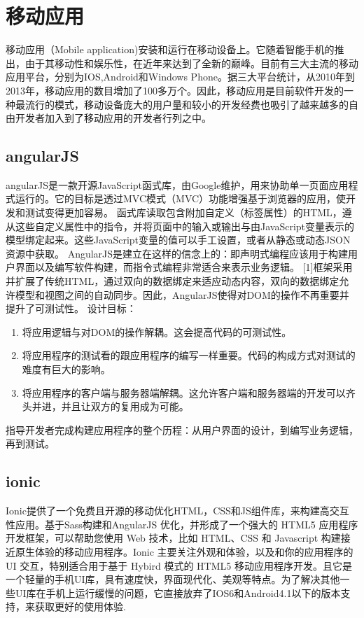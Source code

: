 \section{移动应用}
移动应用（Mobile application)安装和运行在移动设备上。它随着智能手机的推出，由于其移动性和娱乐性，在近年来达到了全新的巅峰。目前有三大主流的移动应用平台，分别为IOS,Android和Windows Phone。据三大平台统计，从2010年到2013年，移动应用的数目增加了100多万个。因此，移动应用是目前软件开发的一种最流行的模式，移动设备庞大的用户量和较小的开发经费也吸引了越来越多的自由开发者加入到了移动应用的开发者行列之中。
\subsection{angularJS}
angularJS是一款开源JavaScript函式库，由Google维护，用来协助单一页面应用程式运行的。它的目标是透过MVC模式（MVC）功能增强基于浏览器的应用，使开发和测试变得更加容易。
函式库读取包含附加自定义（标签属性）的HTML，遵从这些自定义属性中的指令，并将页面中的输入或输出与由JavaScript变量表示的模型绑定起来。这些JavaScript变量的值可以手工设置，或者从静态或动态JSON资源中获取。
AngularJS是建立在这样的信念上的：即声明式编程应该用于构建用户界面以及编写软件构建，而指令式编程非常适合来表示业务逻辑。 [1]框架采用并扩展了传统HTML，通过双向的数据绑定来适应动态内容，双向的数据绑定允许模型和视图之间的自动同步。因此，AngularJS使得对DOM的操作不再重要并提升了可测试性。
设计目标：
\begin{enumerate}
\item 将应用逻辑与对DOM的操作解耦。这会提高代码的可测试性。
\item 将应用程序的测试看的跟应用程序的编写一样重要。代码的构成方式对测试的难度有巨大的影响。
\item 将应用程序的客户端与服务器端解耦。这允许客户端和服务器端的开发可以齐头并进，并且让双方的复用成为可能。
\end{enumerate}
指导开发者完成构建应用程序的整个历程：从用户界面的设计，到编写业务逻辑，再到测试。
\subsection{ionic}
Ionic提供了一个免费且开源的移动优化HTML，CSS和JS组件库，来构建高交互性应用。基于Sass构建和AngularJS 优化，并形成了一个强大的 HTML5 应用程序开发框架，可以帮助您使用 Web 技术，比如 HTML、CSS 和 Javascript 构建接近原生体验的移动应用程序。Ionic 主要关注外观和体验，以及和你的应用程序的 UI 交互，特别适合用于基于 Hybird 模式的 HTML5 移动应用程序开发。且它是一个轻量的手机UI库，具有速度快，界面现代化、美观等特点。为了解决其他一些UI库在手机上运行缓慢的问题，它直接放弃了IOS6和Android4.1以下的版本支持，来获取更好的使用体验.


